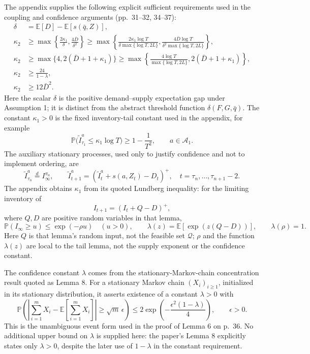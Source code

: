 \documentclass{article}
\begin{document}
The appendix supplies the following explicit sufficient requirements used in the coupling and confidence arguments (pp.\ 31--32, 34--37):
\begin{align*}
\delta&=\mathbb E[D]-\mathbb E[s(\bar q,Z)],\\
\kappa_2&\geq\max\left\{\frac{2\kappa_1}{\delta},\frac{4\bar D}{\delta^2}\right\}
\geq\max\left\{
\frac{2\kappa_1\log T}{\delta\max\{\log T,2L\}},
\frac{4\bar D\log T}{\delta^2\max\{\log T,2L\}}
\right\},\\
\kappa_2&\geq\max\{4,2(\bar D+1+\kappa_1)\}
\geq\max\left\{\frac{4\log T}{\max\{\log T,2L\}},
2(\bar D+1+\kappa_1)\right\},\\
\kappa_2&\geq\frac{24}{1-\lambda},\\
\kappa_2&\geq12\bar D^2.
\end{align*}
Here the scalar \(\delta\) is the positive demand--supply expectation gap under Assumption 1; it is distinct from the abstract threshold function \(\delta(F,G,\bar q)\). The constant \(\kappa_1>0\) is the fixed inventory-tail constant used in the appendix, for example
\[
\mathbb P\big(\tilde I^a_{\tau_1}\leq\kappa_1\log T\big)
\geq1-\frac{1}{T^2},\qquad a\in\mathcal A_1.
\]
The auxiliary stationary processes, used only to justify confidence and not to implement ordering, are
\begin{equation}
\tilde I^a_{\tau_n}\overset d=I_\infty^{\pi_a},\qquad
\tilde I^a_{t+1}=(\tilde I^a_t+s(a,Z_t)-D_t)^+,
\quad t=\tau_n,\ldots,\tau_{n+1}-2.\tag{15}
\end{equation}
The appendix obtains \(\kappa_1\) from its quoted Lundberg inequality: for the limiting inventory of
\[
I_{t+1}=(I_t+Q-D)^+,
\]
where \(Q,D\) are positive random variables in that lemma,
\[
\mathbb P(I_\infty\geq u)\leq\exp(-\rho u)\quad(u>0),
\qquad
\lambda(z)=\mathbb E[\exp(z(Q-D))],\qquad\lambda(\rho)=1.
\]
Here \(Q\) is that lemma's random input, not the feasible set \(\mathcal Q\); \(\rho\) and the function \(\lambda(z)\) are local to the tail lemma, not the supply exponent or the confidence constant.

The confidence constant \(\lambda\) comes from the stationary-Markov-chain concentration result quoted as Lemma 8. For a stationary Markov chain \((X_i)_{i\geq1}\), initialized in its stationary distribution, it asserts existence of a constant \(\lambda>0\) with
\[
\mathbb P\left(
\left|\sum_{i=1}^{m}X_i-\mathbb E\left[\sum_{i=1}^{m}X_i\right]\right|
\geq\sqrt m\,\epsilon
\right)
\leq2\exp\left(-\frac{\epsilon^2(1-\lambda)}4\right),
\qquad\epsilon>0.
\]
This is the unambiguous event form used in the proof of Lemma 6 on p.\ 36. No additional upper bound on \(\lambda\) is supplied here: the paper's Lemma 8 explicitly states only \(\lambda>0\), despite the later use of \(1-\lambda\) in the constant requirement.
\end{document}

